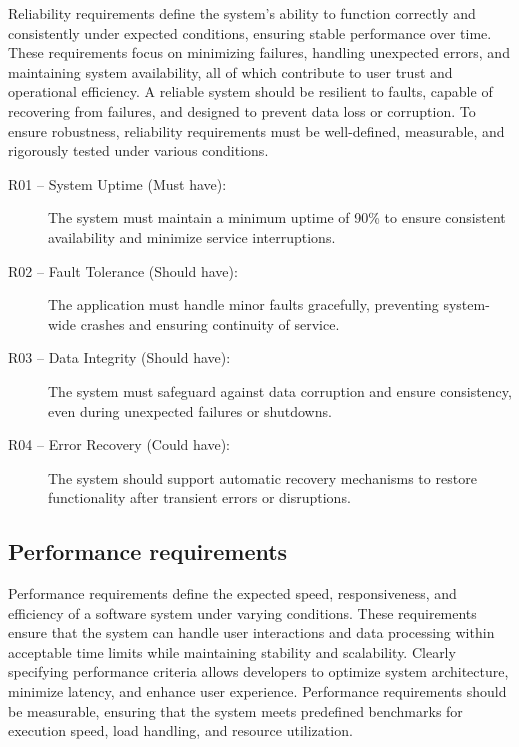 Reliability requirements define the system’s ability to function correctly and consistently under expected conditions, ensuring stable performance over time. These requirements focus on minimizing failures, handling unexpected errors, and maintaining system availability, all of which contribute to user trust and operational efficiency. A reliable system should be resilient to faults, capable of recovering from failures, and designed to prevent data loss or corruption. To ensure robustness, reliability requirements must be well-defined, measurable, and rigorously tested under various conditions. 

\begin{description}
  \item[R01 -- System Uptime (Must have):] The system must maintain a minimum uptime of 90\% to ensure consistent availability and minimize service interruptions.
  
  \item[R02 -- Fault Tolerance (Should have):] The application must handle minor faults gracefully, preventing system-wide crashes and ensuring continuity of service.

  \item[R03 -- Data Integrity (Should have):] The system must safeguard against data corruption and ensure consistency, even during unexpected failures or shutdowns.

  \item[R04 -- Error Recovery (Could have):] The system should support automatic recovery mechanisms to restore functionality after transient errors or disruptions.
\end{description}

\subsection{Performance requirements}

Performance requirements define the expected speed, responsiveness, and efficiency of a software system under varying conditions. These requirements ensure that the system can handle user interactions and data processing within acceptable time limits while maintaining stability and scalability. Clearly specifying performance criteria allows developers to optimize system architecture, minimize latency, and enhance user experience. Performance requirements should be measurable, ensuring that the system meets predefined benchmarks for execution speed, load handling, and resource utilization.


